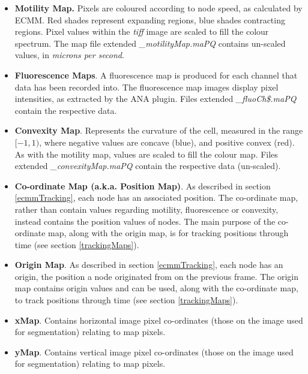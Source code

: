 \documentclass[a4paper,12pt]{article}
\begin{document}
\begin{itemize}

\item \textbf{Motility Map.}   Pixels are coloured according to node speed, as calculated by ECMM.  Red shades 
represent expanding regions, blue shades contracting regions.  Pixel values
within the \textit{tiff} image are scaled to fill the colour spectrum.  The map file extended \textit{\_motilityMap.maPQ} contains 
un-scaled values, in \textit{microns per second}. 

\item \textbf{Fluorescence Maps}.  A fluorescence map is produced for each channel that data has been 
recorded into.  The fluorescence map images display pixel intensities, as extracted by the ANA plugin.
Files extended \textit{\_fluoCh\$.maPQ} contain the respective data. 

\item \textbf{Convexity Map}.   Represents the curvature of the cell, measured in the range $[-1,1)$, where negative values are concave (blue),
and positive convex (red).
As with the motility map, values
are scaled to fill the colour map. Files extended \textit{\_convexityMap.maPQ} contain the respective data (un-scaled). 

\item \textbf{Co-ordinate Map (a.k.a. Position Map)}.  As described in section \ref{ecmmTracking}, each node has an
associated position.  The co-ordinate map, rather than contain values regarding
motility, fluorescence or convexity, instead contains the position values of nodes.  The main
purpose of the co-ordinate map, along with the origin map, is for tracking positions through time (see section \ref{trackingMaps}).

\item \textbf{Origin Map}. As described in section \ref{ecmmTracking}, each node has an origin, the position a node originated from
on the previous frame.  The origin map contains origin values and can be used, along
with the co-ordinate map, to track positions through time (see section \ref{trackingMaps}).

\item \textbf{xMap}.  Contains horizontal image pixel co-ordinates (those on the image used for segmentation) relating to map pixels.

\item \textbf{yMap}.  Contains vertical image pixel co-ordinates (those on the image used for segmentation) relating to map pixels.

\end{itemize}
\end{document}
